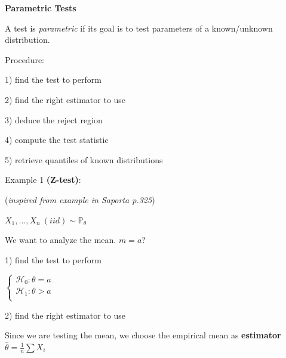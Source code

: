 {\fontsize{12pt}{22pt} \textbf{Parametric Tests}\par}

\vspace{5mm}

A test is \textit{parametric} if its goal is to test parameters of a known/unknown distribution.

\vspace{5mm}

Procedure:

1) find the test to perform

2) find the right estimator to use

3) deduce the reject region

4) compute the test statistic

5) retrieve quantiles of known distributions

\vspace{5mm}

Example 1 \textbf{(Z-test)}: 

\vspace{5mm}

(\textit{inspired from example in Saporta p.325})

\vspace{5mm}

$X_1,...,X_n~(iid)\sim \mathbb{P_\theta}$

\vspace{5mm}

We want to analyze the mean. $m=a$?

\vspace{5mm}

1) find the test to perform

\vspace{5mm}

$
\left\{
    \begin{array}{ll}
        \mathcal{H}_0: \theta=a \\
        \mathcal{H}_1: \theta>a \\
    \end{array}
\right.
$

\vspace{5mm}

2) find the right estimator to use

\vspace{5mm}

Since we are testing the mean, we choose the empirical mean as \textbf{estimator} $\widehat{\theta}=\frac{1}{n}\sum{X_i}$

\vspace{5mm}

